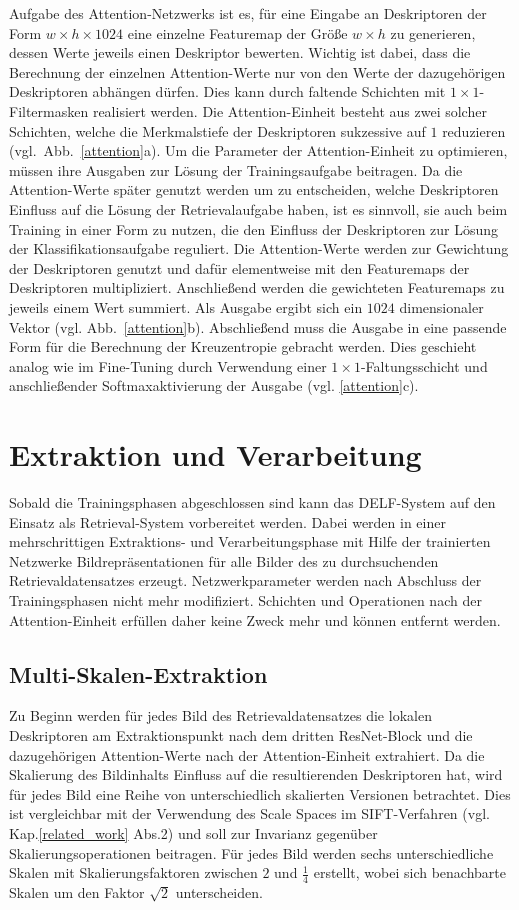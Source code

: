 Aufgabe des Attention-Netzwerks ist es, für eine Eingabe an Deskriptoren der Form $w\times h\times 1024$ eine einzelne Featuremap der Größe $w\times h$ zu generieren, dessen Werte jeweils einen Deskriptor bewerten. Wichtig ist dabei, dass die Berechnung der einzelnen Attention-Werte nur von den Werte der dazugehörigen Deskriptoren abhängen dürfen. Dies kann durch faltende Schichten mit $1\times1$-Filtermasken realisiert werden. Die Attention-Einheit besteht aus zwei solcher Schichten, welche die Merkmalstiefe der Deskriptoren sukzessive auf $1$ reduzieren \mbox{(vgl. Abb.~\ref{attention}a).}  
Um die Parameter der Attention-Einheit zu optimieren, müssen ihre Ausgaben zur Lösung der Trainingsaufgabe beitragen. Da die Attention-Werte später genutzt werden um zu entscheiden, welche Deskriptoren Einfluss auf die Lösung der Retrievalaufgabe haben, ist es sinnvoll, sie auch beim Training in einer Form zu nutzen, die den Einfluss der Deskriptoren zur Lösung der Klassifikationsaufgabe reguliert. Die Attention-Werte werden zur Gewichtung der Deskriptoren genutzt und dafür elementweise mit den Featuremaps der Deskriptoren multipliziert. Anschließend werden die gewichteten Featuremaps zu jeweils einem Wert summiert. Als Ausgabe ergibt sich ein $1024$ dimensionaler Vektor (vgl. Abb.~\ref{attention}b). Abschließend muss die Ausgabe in eine passende Form für die Berechnung der Kreuzentropie gebracht werden. Dies geschieht analog wie im Fine-Tuning durch Verwendung einer $1\times1$-Faltungsschicht und anschließender Softmaxaktivierung der Ausgabe (vgl. \ref{attention}c).


\section{Extraktion und Verarbeitung}

Sobald die Trainingsphasen abgeschlossen sind kann das DELF-System auf den Einsatz als Retrieval-System vorbereitet werden. Dabei werden in einer mehrschrittigen Extraktions- und Verarbeitungsphase mit Hilfe der trainierten Netzwerke Bildrepräsentationen für alle Bilder des zu durchsuchenden Retrievaldatensatzes erzeugt. Netzwerkparameter werden nach Abschluss der Trainingsphasen nicht mehr modifiziert. Schichten und Operationen nach der Attention-Einheit erfüllen daher keine Zweck mehr und können entfernt werden.
\subsection{Multi-Skalen-Extraktion}
Zu Beginn werden für jedes Bild des Retrievaldatensatzes die lokalen Deskriptoren am Extraktionspunkt nach dem dritten ResNet-Block und die dazugehörigen Attention-Werte nach der Attention-Einheit extrahiert. Da die Skalierung des Bildinhalts Einfluss auf die resultierenden Deskriptoren hat, wird für jedes Bild eine Reihe von unterschiedlich skalierten Versionen betrachtet. Dies ist vergleichbar mit der Verwendung des Scale Spaces im SIFT-Verfahren (vgl. Kap.\ref{related_work} Abs.2) und soll zur Invarianz gegenüber Skalierungsoperationen beitragen. Für jedes Bild werden sechs unterschiedliche Skalen mit Skalierungsfaktoren zwischen $2$ und $\frac{1}{4}$ erstellt, wobei sich benachbarte Skalen um den Faktor $\sqrt{2}$ unterscheiden. 
